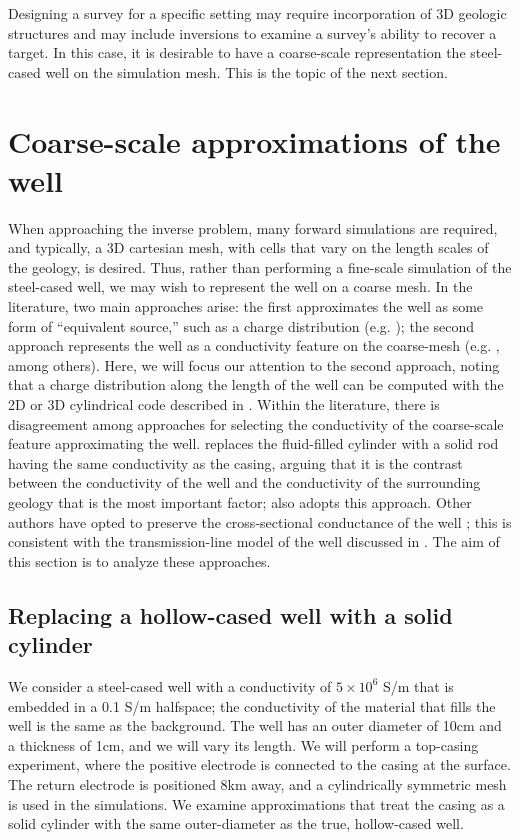 Designing a survey for a specific setting may require incorporation of 3D geologic structures and may include inversions to examine a survey's ability to recover a target. In this case, it is desirable to have a coarse-scale representation the steel-cased well on the simulation mesh. This is the topic of the next section.
\section{Coarse-scale approximations of the well}
\label{sec:approximating_wells}

When approaching the inverse problem, many forward simulations are required, and typically, a 3D cartesian mesh, with cells that vary on the length scales of the geology, is desired. Thus, rather than performing a fine-scale simulation of the steel-cased well, we may wish to represent the well on a coarse mesh. In the literature, two main approaches arise: the first approximates the well as some form of ``equivalent source,'' such as a charge distribution (e.g. \cite{Weiss2016}); the second approach represents the well as a conductivity feature on the coarse-mesh (e.g. \cite{Swidinsky2013, Um2015, Yang2016, Kohnke2017, Puzyrev2017}, among others). Here, we will focus our attention to the second approach, noting that a charge distribution along the length of the well can be computed with the 2D or 3D cylindrical code described in \cite{Heagy2018a}. Within the literature, there is disagreement among approaches for selecting the conductivity of the coarse-scale feature approximating the well. \cite{Um2015} replaces the fluid-filled cylinder with a solid rod having the same conductivity as the casing, arguing that it is the contrast between the conductivity of the well and the conductivity of the surrounding geology that is the most important factor; \cite{Puzyrev2017} also adopts this approach. Other authors have opted to preserve the cross-sectional conductance of the well \citep{Swidinsky2013, Kohnke2017}; this is consistent with the transmission-line model of the well discussed in \cite{Kaufman1990}. The aim of this section is to analyze these approaches.
\subsection{Replacing a hollow-cased well with a solid cylinder}
We consider a steel-cased well with a conductivity of $5\times10^6$ S/m that is embedded in a 0.1 S/m halfspace; the conductivity of the material that fills the well is the same as the background. The well has an outer diameter of 10cm and a thickness of 1cm, and we will vary its length. We will perform a top-casing experiment, where the positive electrode is connected to the casing at the surface. The return electrode is positioned 8km away, and a cylindrically symmetric mesh is used in the simulations. We examine approximations that treat the casing as a solid cylinder with the same outer-diameter as the true, hollow-cased well.


